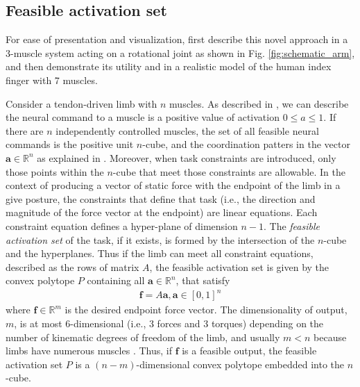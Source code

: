 \label{s:methods}
\subsection*{Feasible activation set}
For ease of presentation and visualization,  first describe this novel approach in a  3-muscle system acting on a  rotational joint as shown in Fig. \ref{fig:schematic_arm}, and then demonstrate its utility and in a realistic model of the human index finger with 7 muscles. 

Consider a tendon-driven limb with $n$ muscles. As described in \cite{Kuo1993Human, Chao1978Graphical,spoor1983balancing,Valero-Cuevas2009mathematical, valero-cuevas2015neuromechanics}, we can describe  the neural command to a muscle is a positive value of activation $0 \leq a \leq 1$.  If there are $n$ independently controlled  muscles,  the set of all feasible neural commands  is the positive unit $n$-cube, and the coordination patters in the vector $\textbf{a} \in \mathbb{R}^n$ as explained in \cite{Valero-Cuevas2009mathematical, valero-cuevas2015fundamentals}. Moreover, when  task constraints are introduced, only those points within the $n$-cube that meet those constraints are allowable. In the context of producing a vector of static force with the endpoint of the limb in a give posture, the constraints that define that task (i.e., the direction and magnitude of the force vector at the endpoint) are linear equations.  Each constraint equation defines a hyper-plane of dimension $n-1$. The \emph{feasible activation set} of the task, if it exists,  is formed by the intersection of the $n$-cube and the hyperplanes.
Thus if the limb can meet all constraint equations, described as the rows of matrix $A$, the feasible activation set is given by the convex polytope $P$ containing all $\textbf{a} \in \mathbb{R}^n$, that satisfy
\begin{align}
\label{eq:constraints}
		\textbf{f} = A\textbf{a}, \textbf{a} \in [0,1]^n
\end{align}
where $\textbf{f} \in \mathbb{R}^m$ is the desired endpoint force vector.
The dimensionality of output, $m$, is  at most 6-dimensional (i.e., 3 forces and 3 torques) depending on the number of kinematic degrees of freedom of the limb, and usually $m < n$  because  limbs have numerous  muscles \cite{Valero-cuevas2015fundamentals}. Thus, if $\textbf{f}$ is a feasible  output, the feasible activation set $P$ is a $(n-m)$-dimensional convex polytope embedded into the $n$-cube.
